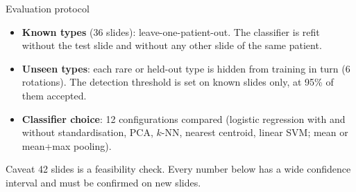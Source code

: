 \documentclass[aspectratio=169,11pt]{beamer}
\begin{document}
\begin{frame}{Evaluation protocol}
  \begin{itemize}
    \item \textbf{Known types} (36 slides): leave-one-patient-out. The classifier is refit without the test slide and without any other slide of the same patient.
    \item \textbf{Unseen types}: each rare or held-out type is hidden from training in turn (6 rotations). The detection threshold is set on known slides only, at 95\% of them accepted.
    \item \textbf{Classifier choice}: 12 configurations compared (logistic regression with and without standardisation, PCA, $k$-NN, nearest centroid, linear SVM; mean or mean+max pooling).
  \end{itemize}
  \vspace{0.8em}
  \begin{alertblock}{Caveat}
    42 slides is a feasibility check. Every number below has a wide confidence interval and must be confirmed on new slides.
  \end{alertblock}
\end{frame}
\end{document}
